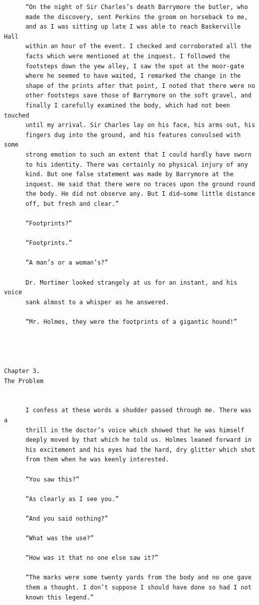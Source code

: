 \documentclass{article}
\begin{document}
\begin{verbatim}
      “On the night of Sir Charles’s death Barrymore the butler, who
      made the discovery, sent Perkins the groom on horseback to me,
      and as I was sitting up late I was able to reach Baskerville Hall
      within an hour of the event. I checked and corroborated all the
      facts which were mentioned at the inquest. I followed the
      footsteps down the yew alley, I saw the spot at the moor-gate
      where he seemed to have waited, I remarked the change in the
      shape of the prints after that point, I noted that there were no
      other footsteps save those of Barrymore on the soft gravel, and
      finally I carefully examined the body, which had not been touched
      until my arrival. Sir Charles lay on his face, his arms out, his
      fingers dug into the ground, and his features convulsed with some
      strong emotion to such an extent that I could hardly have sworn
      to his identity. There was certainly no physical injury of any
      kind. But one false statement was made by Barrymore at the
      inquest. He said that there were no traces upon the ground round
      the body. He did not observe any. But I did—some little distance
      off, but fresh and clear.”

      “Footprints?”

      “Footprints.”

      “A man’s or a woman’s?”

      Dr. Mortimer looked strangely at us for an instant, and his voice
      sank almost to a whisper as he answered.

      “Mr. Holmes, they were the footprints of a gigantic hound!”




Chapter 3.
The Problem


      I confess at these words a shudder passed through me. There was a
      thrill in the doctor’s voice which showed that he was himself
      deeply moved by that which he told us. Holmes leaned forward in
      his excitement and his eyes had the hard, dry glitter which shot
      from them when he was keenly interested.

      “You saw this?”

      “As clearly as I see you.”

      “And you said nothing?”

      “What was the use?”

      “How was it that no one else saw it?”

      “The marks were some twenty yards from the body and no one gave
      them a thought. I don’t suppose I should have done so had I not
      known this legend.”


\end{verbatim}
\end{document}

